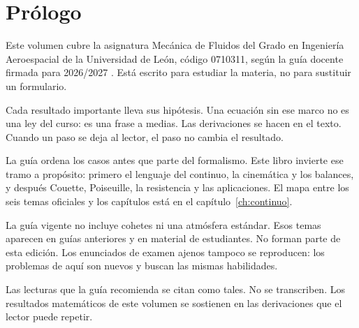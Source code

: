 \chapter*{Prólogo}

Este volumen cubre la asignatura Mecánica de Fluidos del Grado en Ingeniería Aeroespacial de la Universidad de León, código 0710311, según la guía docente firmada para 2026/2027 \parencite{uleGuia2026,ulePlan2026}. Está escrito para estudiar la materia, no para sustituir un formulario.

Cada resultado importante lleva sus hipótesis. Una ecuación sin ese marco no es una ley del curso: es una frase a medias. Las derivaciones se hacen en el texto. Cuando un paso se deja al lector, el paso no cambia el resultado.

La guía ordena los casos antes que parte del formalismo. Este libro invierte ese tramo a propósito: primero el lenguaje del continuo, la cinemática y los balances, y después Couette, Poiseuille, la resistencia y las aplicaciones. El mapa entre los seis temas oficiales y los capítulos está en el capítulo~\ref{ch:continuo}.

\begin{warningbox}
La guía vigente no incluye cohetes ni una atmósfera estándar. Esos temas aparecen en guías anteriores y en material de estudiantes. No forman parte de esta edición. Los enunciados de examen ajenos tampoco se reproducen: los problemas de aquí son nuevos y buscan las mismas habilidades.
\end{warningbox}

Las lecturas que la guía recomienda se citan como tales. No se transcriben. Los resultados matemáticos de este volumen se sostienen en las derivaciones que el lector puede repetir.
